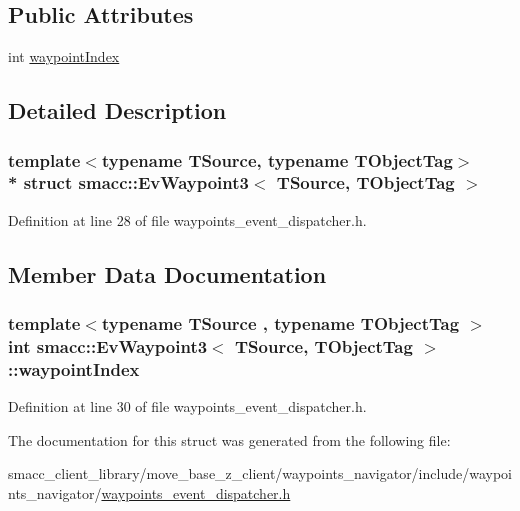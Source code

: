 \subsection*{Public Attributes}
\begin{DoxyCompactItemize}
\item 
int \hyperlink{structsmacc_1_1EvWaypoint3_a5736c13e1d5ef87363115c393c6e45cc}{waypoint\+Index}
\end{DoxyCompactItemize}


\subsection{Detailed Description}
\subsubsection*{template$<$typename T\+Source, typename T\+Object\+Tag$>$\\*
struct smacc\+::\+Ev\+Waypoint3$<$ T\+Source, T\+Object\+Tag $>$}



Definition at line 28 of file waypoints\+\_\+event\+\_\+dispatcher.\+h.



\subsection{Member Data Documentation}
\subsubsection[{\texorpdfstring{waypoint\+Index}{waypointIndex}}]{\setlength{\rightskip}{0pt plus 5cm}template$<$typename T\+Source , typename T\+Object\+Tag $>$ int {\bf smacc\+::\+Ev\+Waypoint3}$<$ T\+Source, T\+Object\+Tag $>$\+::waypoint\+Index}\hypertarget{structsmacc_1_1EvWaypoint3_a5736c13e1d5ef87363115c393c6e45cc}{}\label{structsmacc_1_1EvWaypoint3_a5736c13e1d5ef87363115c393c6e45cc}


Definition at line 30 of file waypoints\+\_\+event\+\_\+dispatcher.\+h.



The documentation for this struct was generated from the following file\+:\begin{DoxyCompactItemize}
\item 
smacc\+\_\+client\+\_\+library/move\+\_\+base\+\_\+z\+\_\+client/waypoints\+\_\+navigator/include/waypoints\+\_\+navigator/\hyperlink{waypoints__event__dispatcher_8h}{waypoints\+\_\+event\+\_\+dispatcher.\+h}\end{DoxyCompactItemize}

